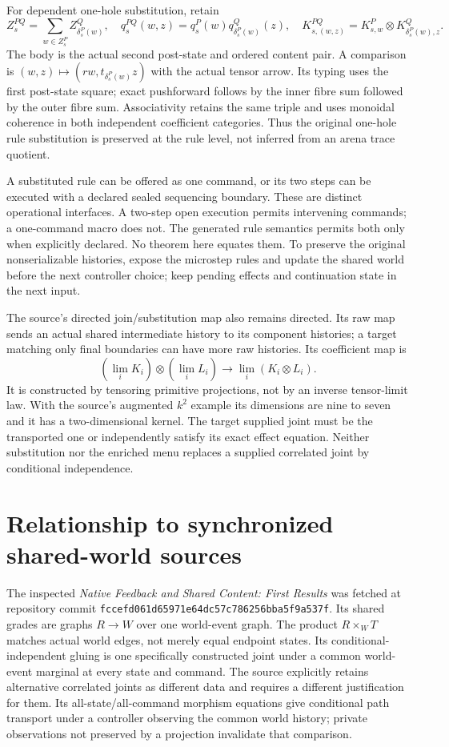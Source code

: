 \documentclass[11pt]{article}
\begin{document}
For dependent one-hole substitution, retain
\[
 Z^{PQ}_{s}=\sum_{w\in Z^P_s} Z^Q_{\delta^P_s(w)},\quad
 q^{PQ}_{s}(w,z)=q^P_s(w)q^Q_{\delta^P_s(w)}(z),\quad
 K^{PQ}_{s,(w,z)}=K^P_{s,w}\otimes K^Q_{\delta^P_s(w),z}.
\]
The body is the actual second post-state and ordered content pair. A comparison is $(w,z)\mapsto(rw,t_{\delta^P_s(w)}z)$ with the actual tensor arrow. Its typing uses the first post-state square; exact pushforward follows by the inner fibre sum followed by the outer fibre sum. Associativity retains the same triple and uses monoidal coherence in both independent coefficient categories. Thus the original one-hole rule substitution is preserved at the rule level, not inferred from an arena trace quotient.

A substituted rule can be offered as one command, or its two steps can be executed with a declared sealed sequencing boundary. These are distinct operational interfaces. A two-step open execution permits intervening commands; a one-command macro does not. The generated rule semantics permits both only when explicitly declared. No theorem here equates them. To preserve the original nonserializable histories, expose the microstep rules and update the shared world before the next controller choice; keep pending effects and continuation state in the next input.

The source's directed join/substitution map also remains directed. Its raw map sends an actual shared intermediate history to its component histories; a target matching only final boundaries can have more raw histories. Its coefficient map is
\[
 (\lim_iK_i)\otimes(\lim_iL_i)\longrightarrow\lim_i(K_i\otimes L_i).
\]
It is constructed by tensoring primitive projections, not by an inverse tensor-limit law. With the source's augmented $k^2$ example its dimensions are nine to seven and it has a two-dimensional kernel. The target supplied joint must be the transported one or independently satisfy its exact effect equation. Neither substitution nor the enriched menu replaces a supplied correlated joint by conditional independence.

\section{Relationship to synchronized shared-world sources}
The inspected \emph{Native Feedback and Shared Content: First Results} was fetched at repository commit
\texttt{fccefd061d65971e64dc57c786256bba5f9a537f}.
Its shared grades are graphs $R\to W$ over one world-event graph. The product $R\times_W T$ matches actual world edges, not merely equal endpoint states. Its conditional-independent gluing is one specifically constructed joint under a common world-event marginal at every state and command. The source explicitly retains alternative correlated joints as different data and requires a different justification for them. Its all-state/all-command morphism equations give conditional path transport under a controller observing the common world history; private observations not preserved by a projection invalidate that comparison.
\end{document}
